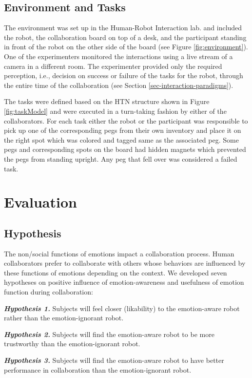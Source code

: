 \documentclass{sig-alternate-05-2015}
\begin{document}
\subsection{Environment and Tasks}

The environment was set up in the Human-Robot Interaction lab. and included the
robot, the collaboration board on top of a desk, and the participant standing in
front of the robot on the other side of the board (see Figure
\ref{fig:environment}). One of the experimenters monitored the interactions
using a live stream of a camera in a different room. The experimenter provided
only the required perception, i.e., decision on success or failure of the tasks
for the robot, through the entire time of the collaboration (see Section
\ref{sec-interaction-paradigms}).

The tasks were defined based on the HTN structure shown in Figure
\ref{fig:taskModel} and were executed in a turn-taking fashion by either of the
collaborators. For each task either the robot or the participant was responsible
to pick up one of the corresponding pegs from their own inventory and place it
on the right spot which was colored and tagged same as the associated peg. Some
pegs and corresponding spots on the board had hidden magnets which prevented the
pegs from standing upright. Any peg that fell over was considered a failed task. 

\section{Evaluation}
\subsection{Hypothesis}

The non/social functions of emotions impact a collaboration process. Human
collaborators prefer to collaborate with others whose behaviors are influenced
by these functions of emotions depending on the context. We developed seven
hypotheses on positive influence of emotion-awareness and usefulness of emotion
function during collaboration:

\textit{\textbf{Hypothesis 1.}} Subjects will feel closer (likability) to the
emotion-aware robot rather than the emotion-ignorant robot.

\textit{\textbf{Hypothesis 2.}} Subjects will find the emotion-aware robot to be
more trustworthy than the emotion-ignorant robot.

\textit{\textbf{Hypothesis 3.}} Subjects will find the emotion-aware robot to
have better performance in collaboration than the emotion-ignorant robot.
\end{document}
